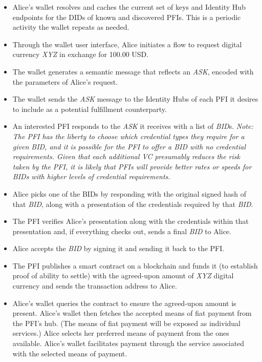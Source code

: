 \documentclass[11pt]{article}
\begin{document}
\begin{itemize}
	\item Alice’s wallet resolves and caches the current set of keys and Identity Hub endpoints for the DIDs of known and discovered PFIs. This is a periodic activity the wallet repeats as needed.

	\item Through the wallet user interface, Alice initiates a flow to request digital currency \textit{XYZ} in exchange for 100.00 USD.

	\item The wallet generates a semantic message that reflects an \textit{ASK}, encoded with the parameters of Alice’s request.  

	\item The wallet sends the \textit{ASK} message to the Identity Hubs of each PFI it desires to include as a potential fulfillment counterparty.

	\item An interested PFI responds to the \textit{ASK} it receives with a list of \textit{BID}s.\textit{ Note: The PFI has the liberty to choose which credential types they require for a given BID, and it is possible for the PFI to offer a BID with no credential requirements. Given that each additional VC presumably reduces the risk taken by the PFI, it is likely that PFIs will provide better rates or speeds for BIDs with higher levels of credential requirements. }

	\item Alice picks one of the BIDs by responding with the original signed hash of that \textit{BID}, along with a presentation of the credentials required by that \textit{BID}. 

	\item The PFI verifies Alice’s presentation along with the credentials within that presentation and, if everything checks out, sends a final \textit{BID} to Alice.

	\item Alice accepts the \textit{BID} by signing it and sending it back to the PFI.

	\item The PFI publishes a smart contract on a blockchain and funds it (to establish proof of ability to settle) with the agreed-upon amount of \textit{XYZ} digital currency and sends the transaction address to Alice.

	\item Alice’s wallet queries the contract to ensure the agreed-upon amount is present. Alice’s wallet then fetches the accepted means of fiat payment from the PFI’s hub. (The means of fiat payment will be exposed as individual services.) Alice selects her preferred means of payment from the ones available. Alice’s wallet facilitates payment through the service associated with the selected means of payment.


\end{itemize}
\end{document}
